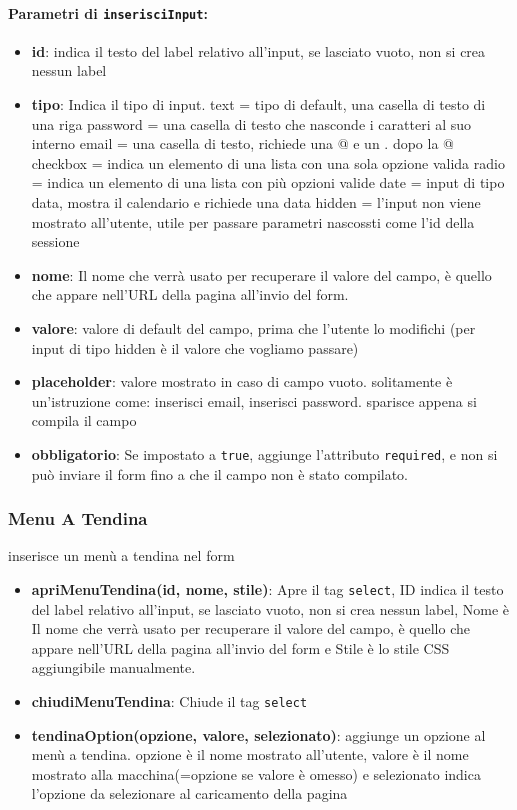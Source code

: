 \documentclass[a4paper,12pt]{article}
\begin{document}
\paragraph{Parametri di \texttt{inserisciInput}:}
\begin{itemize}
    \item \textbf{id}: indica il testo del label relativo all'input, se lasciato vuoto, non si crea nessun label
    \item \textbf{tipo}: Indica il tipo di input.
        \subitem text = tipo di default, una casella di testo di una riga
        \subitem password = una casella di testo che nasconde i caratteri al suo interno
        \subitem email = una casella di testo, richiede una @ e un . dopo la @
        \subitem checkbox = indica un elemento di una lista con una sola opzione valida
        \subitem radio = indica un elemento di una lista con più opzioni valide
        \subitem date = input di tipo data, mostra il calendario e richiede una data
        \subitem hidden = l'input non viene mostrato all'utente, utile per passare parametri nascossti come l'id della sessione
    \item \textbf{nome}: Il nome che verrà usato per recuperare il valore del campo, è quello che appare nell'URL della pagina all'invio del form.
    \item \textbf{valore}: valore di default del campo, prima che l'utente lo modifichi (per input di tipo hidden è il valore che vogliamo passare)
    \item \textbf{placeholder}: valore mostrato in caso di campo vuoto. solitamente è un'istruzione come: inserisci email, inserisci password. sparisce appena si compila il campo
    \item \textbf{obbligatorio}: Se impostato a \texttt{true}, aggiunge l'attributo \texttt{required}, e non si può inviare il form fino a che il campo non è stato compilato.
\end{itemize}

\subsubsection{Menu A Tendina}
inserisce un menù a tendina nel form
\begin{itemize}
    \item \textbf{apriMenuTendina(id, nome, stile)}: Apre il tag \texttt{select}, ID indica il testo del label relativo all'input, se lasciato vuoto, non si crea nessun label, Nome è Il nome che verrà usato per recuperare il valore del campo, è quello che appare nell'URL della pagina all'invio del form e Stile è lo stile CSS aggiungibile manualmente.
    \item \textbf{chiudiMenuTendina}: Chiude il tag \texttt{select}
    \item \textbf{tendinaOption(opzione, valore, selezionato)}: aggiunge un opzione al menù a tendina. opzione è il nome mostrato all'utente, valore è il nome mostrato alla macchina(=opzione se valore è omesso) e selezionato indica l'opzione da selezionare al caricamento della pagina

\end{itemize}
\end{document}
